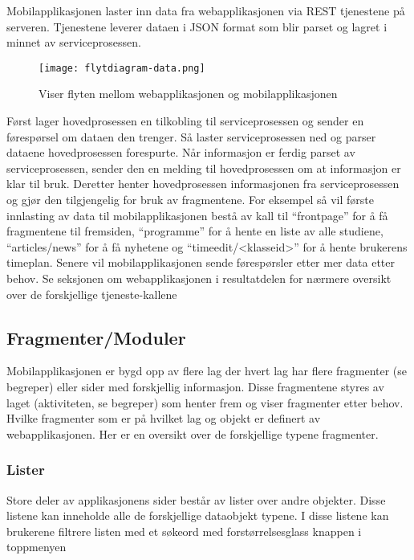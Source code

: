 \documentclass[../main.tex]{subfiles}
\begin{document}
Mobilapplikasjonen laster inn data fra webapplikasjonen via REST tjenestene på serveren. Tjenestene leverer dataen i JSON format som blir parset og lagret i minnet av serviceprosessen.

\begin{figure}[H]
  \centering
  \texttt{[image: flytdiagram-data.png]}
  \caption{Viser flyten mellom webapplikasjonen og mobilapplikasjonen}
\end{figure}

Først lager hovedprosessen en tilkobling til serviceprosessen og sender en førespørsel om dataen den trenger. Så laster serviceprosessen ned og parser dataene hovedprosessen forespurte. Når informasjon er ferdig parset av serviceprosessen, sender den en melding til hovedprosessen om at informasjon er klar til bruk. Deretter henter hovedprosessen informasjonen fra serviceprosessen og gjør den tilgjengelig for bruk av fragmentene.\newline
For eksempel så vil første innlasting av data til mobilapplikasjonen bestå av kall til “frontpage” for å få fragmentene til fremsiden, “programme” for å hente en liste av alle studiene, “articles/news” for å få nyhetene og “timeedit/<klasseid>” for å hente brukerens timeplan. Senere vil mobilapplikasjonen sende førespørsler etter mer data etter behov. Se seksjonen om webapplikasjonen i resultatdelen for nærmere oversikt over de forskjellige tjeneste-kallene

\subsection{Fragmenter/Moduler}

Mobilapplikasjonen er bygd opp av flere lag der hvert lag har flere fragmenter (se begreper) eller sider med forskjellig informasjon. Disse fragmentene styres av laget (aktiviteten, se begreper) som henter frem og viser fragmenter etter behov. Hvilke fragmenter som er på hvilket lag og objekt er definert av webapplikasjonen. Her er en oversikt over de forskjellige typene fragmenter.

\subsubsection{Lister}

Store deler av applikasjonens sider består av lister over andre objekter. Disse listene kan inneholde alle de forskjellige dataobjekt typene. I disse listene kan brukerene filtrere listen med et søkeord med forstørrelsesglass knappen i toppmenyen
\end{document}
